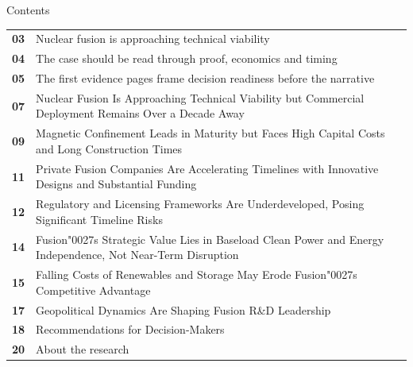 \documentclass[10pt,a4paper]{article}
\newcommand{\BOApos}{{\BOQuoteFont\char"0027}}
\begin{document}
\clearpage
{\sffamily\fontsize{26}{31}\selectfont\color{BONavy} Contents}\par\vspace{10pt}
\begin{tabularx}{\linewidth}{p{14mm}Y}
\textcolor{BOGreen}{\bfseries 03} & Nuclear fusion is approaching technical viability \\[5pt]
\textcolor{BOGreen}{\bfseries 04} & The case should be read through proof, economics and timing \\[5pt]
\textcolor{BOGreen}{\bfseries 05} & The first evidence pages frame decision readiness before the narrative \\[5pt]
\textcolor{BOGreen}{\bfseries 07} & Nuclear Fusion Is Approaching Technical Viability but Commercial Deployment Remains Over a Decade Away \\[5pt]
\textcolor{BOGreen}{\bfseries 09} & Magnetic Confinement Leads in Maturity but Faces High Capital Costs and Long Construction Times \\[5pt]
\textcolor{BOGreen}{\bfseries 11} & Private Fusion Companies Are Accelerating Timelines with Innovative Designs and Substantial Funding \\[5pt]
\textcolor{BOGreen}{\bfseries 12} & Regulatory and Licensing Frameworks Are Underdeveloped, Posing Significant Timeline Risks \\[5pt]
\textcolor{BOGreen}{\bfseries 14} & Fusion\BOApos{}s Strategic Value Lies in Baseload Clean Power and Energy Independence, Not Near-Term Disruption \\[5pt]
\textcolor{BOGreen}{\bfseries 15} & Falling Costs of Renewables and Storage May Erode Fusion\BOApos{}s Competitive Advantage \\[5pt]
\textcolor{BOGreen}{\bfseries 17} & Geopolitical Dynamics Are Shaping Fusion R\&D Leadership \\[5pt]
\textcolor{BOGreen}{\bfseries 18} & Recommendations for Decision-Makers \\[5pt]
\textcolor{BOGreen}{\bfseries 20} & About the research \\[5pt]
\end{tabularx}
\clearpage
\end{document}
